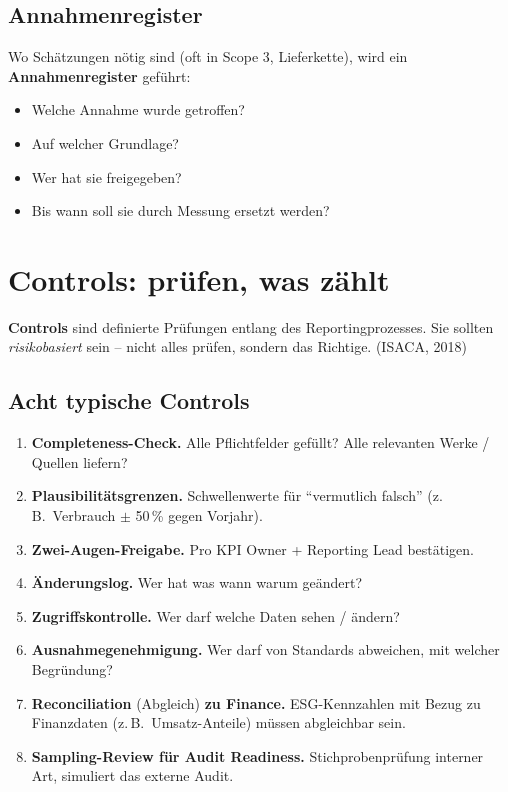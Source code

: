\documentclass[11pt,a4paper,oneside]{article}
\newcommand{\fachbegriff}[1]{\textbf{#1}}
\newcommand{\quelle}[1]{{\footnotesize\color{lpGray}(#1)}}
\begin{document}
\subsection{Annahmenregister}

Wo Schätzungen nötig sind (oft in Scope 3, Lieferkette), wird ein \fachbegriff{Annahmenregister} geführt:

\begin{itemize}
  \item Welche Annahme wurde getroffen?
  \item Auf welcher Grundlage?
  \item Wer hat sie freigegeben?
  \item Bis wann soll sie durch Messung ersetzt werden?
\end{itemize}

\section{Controls: prüfen, was zählt}

\fachbegriff{Controls} sind definierte Prüfungen entlang des Reportingprozesses. Sie sollten \emph{risikobasiert} sein -- nicht alles prüfen, sondern das Richtige. \quelle{ISACA, 2018}

\subsection{Acht typische Controls}

\begin{enumerate}
  \item \textbf{Completeness-Check.} Alle Pflichtfelder gefüllt? Alle relevanten Werke / Quellen liefern?
  \item \textbf{Plausibilitätsgrenzen.} Schwellenwerte für ``vermutlich falsch'' (z.\,B.\ Verbrauch $\pm$ 50\,\% gegen Vorjahr).
  \item \textbf{Zwei-Augen-Freigabe.} Pro KPI Owner + Reporting Lead bestätigen.
  \item \textbf{Änderungslog.} Wer hat was wann warum geändert?
  \item \textbf{Zugriffskontrolle.} Wer darf welche Daten sehen / ändern?
  \item \textbf{Ausnahmegenehmigung.} Wer darf von Standards abweichen, mit welcher Begründung?
  \item \textbf{Reconciliation} (Abgleich) \textbf{zu Finance.} ESG-Kennzahlen mit Bezug zu Finanzdaten (z.\,B.\ Umsatz-Anteile) müssen abgleichbar sein.
  \item \textbf{Sampling-Review für Audit Readiness.} Stichprobenprüfung interner Art, simuliert das externe Audit.
\end{enumerate}
\end{document}
